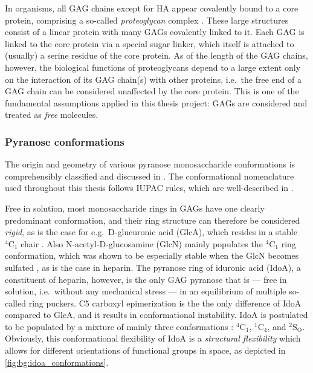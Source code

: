 In organisms, all GAG chains except for HA  appear covalently bound to a core
protein, comprising a so-called \textit{proteoglycan} complex
\cite{essentials_glycobiology_gags_chapter_2009}. These large structures consist
of a linear protein with many GAGs covalently linked to it. Each GAG is linked
to the core protein via a special sugar linker, which itself is attached to
(usually) a serine residue of the core protein. As of the length of the GAG
chains, however, the biological functions of proteoglycans depend to a large
extent only on the interaction of its GAG chain(s) with other proteins, i.e.\
the free end of a GAG chain can be considered unaffected by the core protein.
This is one of the fundamental assumptions applied in this thesis project: GAGs
are considered and treated as \textit{free} molecules.





\subsubsection{Pyranose conformations}
\label{background:gags:conformations}

The origin and geometry of various pyranose monosaccharide conformations is
comprehensibly classified and discussed in
\cite{classification_pyranose_conformers_1960}. The conformational nomenclature
used throughout this thesis follows IUPAC rules, which are well-described in
\cite{iupac_gag_conformations_1980}.

Free in solution, most monosaccharide rings in GAGs have one clearly predominant
conformation, and their ring structure can therefore be considered
\textit{rigid}, as is the case for e.g.\ D-glucuronic acid (GlcA), which resides
in a stable ${}^{4}\mathrm{C}_1$ chair \cite{almond_jacs_2010}. Also
N-acetyl-D-glucosamine (GlcN) mainly populates the ${}^{4}\mathrm{C}_1$ ring
conformation, which was shown to be especially stable when the GlcN becomes
sulfated \cite{Sattelle_glcnac_right_chair_2011}, as is the case in heparin. The
pyranose ring of iduronic acid (IdoA), a constituent of heparin, however, is the
only GAG pyranose that is --- free in solution, i.e.\ without any mechanical
stress --- in an equilibrium of multiple so-called ring puckers. C5 carboxyl
epimerization is the the only difference of IdoA compared to GlcA, and it
results in conformational instability. IdoA is postulated to be populated by a
mixture of mainly three conformations \cite{almond_jacs_2010}:
${}^{4}\mathrm{C}_1$, ${}^{1}\mathrm{C}_4$, and ${}^{2}\mathrm{S}_\mathrm{O}$.
Obviously, this conformational flexibility of IdoA is a \textit{structural
flexibility} which allows for different orientations of functional groups in
space, as depicted in \cref{fig:bg:idoa_conformations}.

